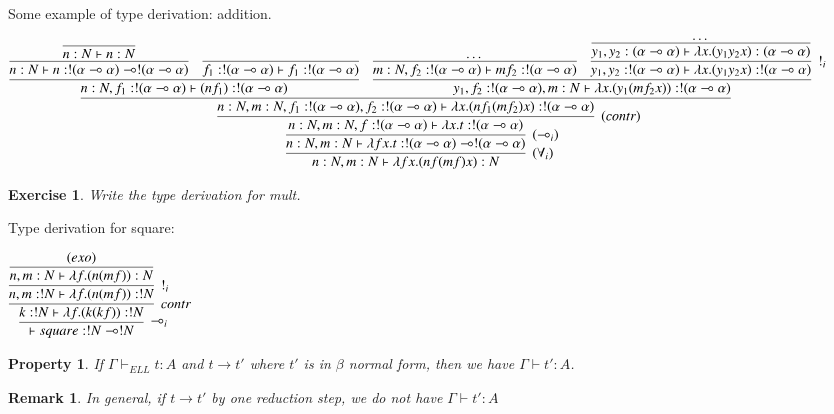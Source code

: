 \documentclass[a4paper,10pt]{article}
\newcommand{\limpl}{\multimap}  %
\newtheorem{prop}{Property}
\newtheorem{exo}{Exercise}
\newtheorem{rmk}{Remark}
\begin{document}
 Some example of type derivation: addition.\\
\vspace{0.3cm}
\hspace{-1.5cm}
\begin{small}
$ \infer[(\forall_i)]{n:N, m:N \vdash \lambda f x.(n f (m f) x) : N}
	{
	\infer[(\limpl_i)]{n:N , m:N \vdash \lambda f x. t : !(\alpha \limpl \alpha) \limpl !(\alpha \limpl \alpha)}
	{
	\infer[(contr)]{n:N , m:N, f:!(\alpha \limpl \alpha) \vdash \lambda x.t : !(\alpha \limpl \alpha)}
		{
			\infer{n:N , m:N, f_1:!(\alpha \limpl \alpha), f_2:!(\alpha \limpl \alpha) \vdash \lambda x. (n f_1 (m f_2) x) : !(\alpha \limpl \alpha)}
			{
			\infer{n:N, f_1:!(\alpha \limpl \alpha) \vdash (n f_1):!(\alpha \limpl \alpha)}
				{
				\infer{n:N \vdash n:!(\alpha \limpl \alpha) \limpl !(\alpha \limpl \alpha)}{\infer{n:N \vdash n:N}{}}
				&
				\infer{f_1:!(\alpha \limpl \alpha) \vdash f_1:!(\alpha \limpl \alpha)}{}
				}
			&
			\infer{y_1,f_2:!(\alpha \limpl \alpha), m:N \vdash \lambda x.(y_1 (m f_2 x)): !(\alpha \limpl \alpha)}
				{
				\infer{m:N, f_2:!(\alpha\limpl\alpha) \vdash m f_2 : !(\alpha \limpl \alpha)}{ \dots }
				&
				\infer[!_i]{y_1, y_2:!(\alpha \limpl \alpha) \vdash \lambda x. (y_1 y_2 x):!(\alpha \limpl \alpha)}
					{
					\infer{y_1, y_2:(\alpha \limpl \alpha) \vdash \lambda x. (y_1 y_2 x):(\alpha \limpl \alpha)}{ \dots } 
					}
				}
			}
		}
	}
	}$
\end{small}

\begin{exo}
Write the type derivation for mult.
\end{exo}

 Type derivation for square:
\begin{center}
$	\infer[\limpl_i]{\vdash square: !N \limpl !N}{
		\infer[contr]{k:!N \vdash \lambda f.(k (k f)): !N}{
			\infer[!_i]{n,m:!N \vdash \lambda f.(n (m f)): !N}{
				\infer{n,m:N \vdash \lambda f.(n (m f)): N}{ (exo) }
			}
		}
	}$
\end{center}

\begin{prop}
If $\Gamma \vdash_{ELL} t:A$ and $t \rightarrow t'$ where $t'$ is in $\beta$ normal form, then we have $\Gamma \vdash t':A$.
\end{prop}

\begin{rmk}
In general, if $t \rightarrow t'$ by one reduction step, we do not have $\Gamma \vdash t':A$
\end{rmk}
\end{document}

